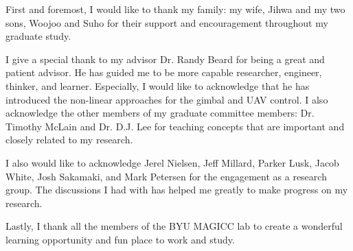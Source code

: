 \afterpage{\cleardoublepage}
%
First and foremost, I would like to thank my family: my wife, Jihwa and my two sons, Woojoo and Suho for their support and encouragement throughout my graduate study.

I give a special thank to my advisor Dr. Randy Beard for being a great and patient advisor. He has guided me to be more capable researcher, engineer, thinker, and learner. Especially, I would like to acknowledge that he has introduced the non-linear approaches for the gimbal and UAV control. I also acknowledge the other members of my graduate committee members: Dr. Timothy McLain and Dr. D.J. Lee for teaching concepts that are important and closely related to my research.

I also would like to acknowledge Jerel Nielsen, Jeff Millard, Parker Lusk, Jacob White, Josh Sakamaki, and Mark Petersen for the engagement as a research group. The discussions I had with has helped me greatly to make progress on my research.

Lastly, I thank all the members of the BYU MAGICC lab to create a wonderful learning opportunity and fun place to work and study.
